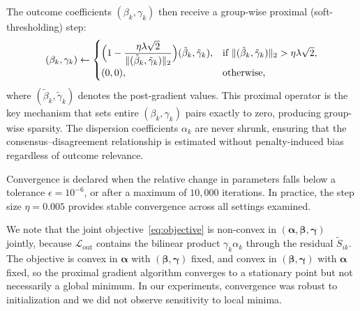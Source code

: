 \documentclass[referee,lineno,pdflatex,sn-vancouver-num]{sn-jnl}
\begin{document}
The outcome coefficients $(\beta_k, \gamma_k)$ then receive a group-wise proximal (soft-thresholding) step:
\[
  (\beta_k, \gamma_k) \leftarrow
  \begin{cases}
    \displaystyle \Bigl(1 - \frac{\eta\lambda\sqrt{2}}{\|(\tilde\beta_k, \tilde\gamma_k)\|_2}\Bigr)
    (\tilde\beta_k, \tilde\gamma_k),
    & \text{if } \|(\tilde\beta_k, \tilde\gamma_k)\|_2 > \eta\lambda\sqrt{2}, \\[6pt]
    (0,0), & \text{otherwise},
  \end{cases}
\]
where $(\tilde\beta_k, \tilde\gamma_k)$ denotes the post-gradient values.
This proximal operator is the key mechanism that sets entire $(\beta_k, \gamma_k)$ pairs exactly to zero, producing group-wise sparsity.
The dispersion coefficients $\alpha_k$ are never shrunk, ensuring that the consensus--disagreement relationship is estimated without penalty-induced bias regardless of outcome relevance.

Convergence is declared when the relative change in parameters falls below a tolerance $\epsilon = 10^{-6}$, or after a maximum of $10{,}000$ iterations.
In practice, the step size $\eta = 0.005$ provides stable convergence across all settings examined.

We note that the joint objective~\eqref{eq:objective} is non-convex in $(\boldsymbol{\alpha}, \boldsymbol{\beta}, \boldsymbol{\gamma})$ jointly, because $\mathcal{L}_{\mathrm{out}}$ contains the bilinear product $\gamma_k \alpha_k$ through the residual $\tilde S_{ik}$.
The objective is convex in $\boldsymbol{\alpha}$ with $(\boldsymbol{\beta}, \boldsymbol{\gamma})$ fixed, and convex in $(\boldsymbol{\beta}, \boldsymbol{\gamma})$ with $\boldsymbol{\alpha}$ fixed, so the proximal gradient algorithm converges to a stationary point but not necessarily a global minimum.
In our experiments, convergence was robust to initialization and we did not observe sensitivity to local minima.
\end{document}
